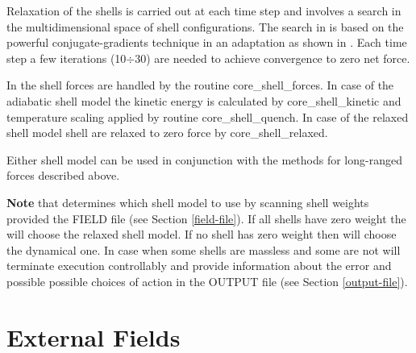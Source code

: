 Relaxation of the shells is carried out at each time step and
involves a search in the multidimensional space of shell
configurations.  The search in \D is based on the powerful
conjugate-gradients technique \cite{shewchuk-94a} in an adaptation
as shown in \cite{lindan-93a}.  Each time step a few iterations
(10$\div$30) are needed to achieve convergence to zero net force.

In \D the shell forces are handled by the routine
{\sc core\_shell\_forces}.  In case of the adiabatic shell model
the kinetic energy is calculated by {\sc core\_shell\_kinetic} and
temperature scaling applied by routine {\sc core\_shell\_quench}.
In case of the relaxed shell model shell are relaxed to zero force
by {\sc core\_shell\_relaxed}.

Either shell model can be used in
conjunction with the methods for long-ranged forces described above.

{\bf Note} that \D determines which shell model to use by scanning
shell weights provided the FIELD file (see Section \ref{field-file}).
If all shells have zero weight the \D will choose the relaxed shell
model.  If no shell has zero weight then \D will choose the dynamical
one.  In case when some shells are massless and some are not \D will
terminate execution controllably and provide information about the
error and possible possible choices of action in the OUTPUT file
(see Section \ref{output-file}).

\section{External Fields}
\label{external-field}

